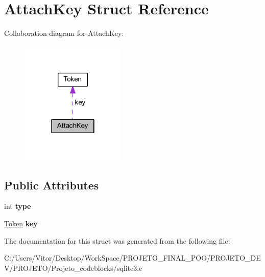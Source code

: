 \hypertarget{struct_attach_key}{\section{Attach\-Key Struct Reference}
\label{struct_attach_key}
}


Collaboration diagram for Attach\-Key\-:\nopagebreak
\begin{figure}[H]
\begin{center}
\leavevmode
\includegraphics[width=142pt]{struct_attach_key__coll__graph}
\end{center}
\end{figure}
\subsection*{Public Attributes}
\begin{DoxyCompactItemize}
\item 
\hypertarget{struct_attach_key_acd780bfae7415a79a90fa5ceb41515cd}{int {\bfseries type}}\label{struct_attach_key_acd780bfae7415a79a90fa5ceb41515cd}

\item 
\hypertarget{struct_attach_key_a267449f11a142a3b88c54aa01f842ad0}{\hyperlink{struct_token}{Token} {\bfseries key}}\label{struct_attach_key_a267449f11a142a3b88c54aa01f842ad0}

\end{DoxyCompactItemize}


The documentation for this struct was generated from the following file\-:\begin{DoxyCompactItemize}
\item 
C\-:/\-Users/\-Vitor/\-Desktop/\-Work\-Space/\-P\-R\-O\-J\-E\-T\-O\-\_\-\-F\-I\-N\-A\-L\-\_\-\-P\-O\-O/\-P\-R\-O\-J\-E\-T\-O\-\_\-\-D\-E\-V/\-P\-R\-O\-J\-E\-T\-O/\-Projeto\-\_\-codeblocks/sqlite3.\-c\end{DoxyCompactItemize}
